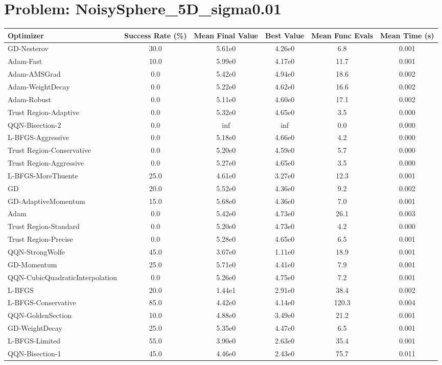 \documentclass{article}
\begin{document}
\section{Problem: NoisySphere\_5D\_sigma0.01}
\begin{longtable}{p{3cm}*{5}{c}}
\toprule
\textbf{Optimizer} & \textbf{Success Rate (\%)} & \textbf{Mean Final Value} & \textbf{Best Value} & \textbf{Mean Func Evals} & \textbf{Mean Time (s)} \\
\midrule
GD-Nesterov & 30.0 & 5.61e0 & 4.26e0 & 6.8 & 0.001 \\
Adam-Fast & 10.0 & 5.99e0 & 4.17e0 & 11.7 & 0.001 \\
Adam-AMSGrad & 0.0 & 5.42e0 & 4.94e0 & 18.6 & 0.002 \\
Adam-WeightDecay & 0.0 & 5.22e0 & 4.62e0 & 16.6 & 0.002 \\
Adam-Robust & 0.0 & 5.11e0 & 4.60e0 & 17.1 & 0.002 \\
Trust Region-Adaptive & 0.0 & 5.32e0 & 4.65e0 & 3.5 & 0.000 \\
QQN-Bisection-2 & 0.0 & inf & inf & 0.0 & 0.000 \\
L-BFGS-Aggressive & 0.0 & 5.18e0 & 4.66e0 & 4.2 & 0.000 \\
Trust Region-Conservative & 0.0 & 5.20e0 & 4.59e0 & 5.7 & 0.000 \\
Trust Region-Aggressive & 0.0 & 5.27e0 & 4.65e0 & 3.5 & 0.000 \\
L-BFGS-MoreThuente & 25.0 & 4.61e0 & 3.27e0 & 12.3 & 0.001 \\
GD & 20.0 & 5.52e0 & 4.36e0 & 9.2 & 0.002 \\
GD-AdaptiveMomentum & 15.0 & 5.68e0 & 4.36e0 & 7.0 & 0.001 \\
Adam & 0.0 & 5.42e0 & 4.73e0 & 26.1 & 0.003 \\
Trust Region-Standard & 0.0 & 5.20e0 & 4.73e0 & 4.2 & 0.000 \\
Trust Region-Precise & 0.0 & 5.28e0 & 4.65e0 & 6.5 & 0.001 \\
QQN-StrongWolfe & 45.0 & 3.67e0 & 1.11e0 & 18.9 & 0.001 \\
GD-Momentum & 25.0 & 5.71e0 & 4.41e0 & 7.9 & 0.001 \\
QQN-CubicQuadraticInterpolation & 0.0 & 5.26e0 & 4.75e0 & 7.2 & 0.001 \\
L-BFGS & 20.0 & 1.44e1 & 2.91e0 & 38.4 & 0.002 \\
L-BFGS-Conservative & 85.0 & 4.42e0 & 4.14e0 & 120.3 & 0.004 \\
QQN-GoldenSection & 10.0 & 4.88e0 & 3.49e0 & 21.2 & 0.001 \\
GD-WeightDecay & 25.0 & 5.35e0 & 4.47e0 & 6.5 & 0.001 \\
L-BFGS-Limited & 55.0 & 3.90e0 & 2.63e0 & 35.4 & 0.001 \\
QQN-Bisection-1 & 45.0 & 4.46e0 & 2.43e0 & 75.7 & 0.011 \\
\bottomrule
\end{longtable}
\end{document}
